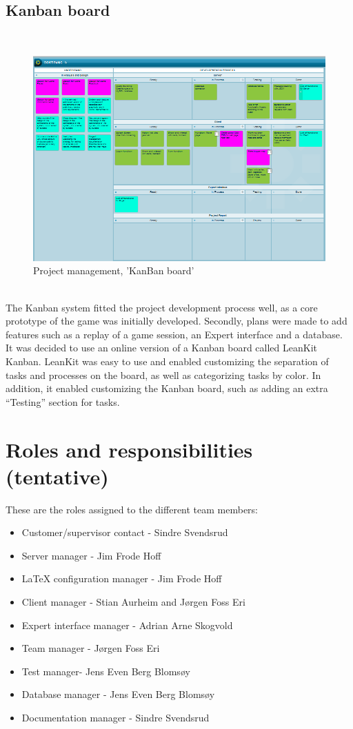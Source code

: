 \subsection{Kanban board}
\\
\begin{figure}[H]
  \centering
    \includegraphics[width=1.0\textwidth]{img/kanban.png}
  \caption{Project management, 'KanBan board'} 
  \label{fig:kanban}
\end{figure}
\\
The Kanban system fitted the project development process well, as a core 
prototype of the game was initially developed. Secondly, plans were made to 
add features such as a replay of a game session, an Expert interface and a 
database. It was decided to use an online version of a Kanban board called 
LeanKit Kanban. LeanKit was easy to use and enabled customizing the separation 
of tasks and processes on the board, as well as categorizing tasks by color. 
In addition, it enabled customizing the Kanban board, such as adding an extra 
“Testing” section for tasks.




\section{Roles and responsibilities (tentative)}
These are the roles assigned to the different team members:

\begin{itemize} \setlength{\itemsep}{0cm}\setlength{\parskip}{0cm}
	\item Customer/supervisor contact - Sindre Svendsrud
	\item Server manager - Jim Frode Hoff
	\item LaTeX configuration manager - Jim Frode Hoff
	\item Client manager - Stian Aurheim and Jørgen Foss Eri
	\item Expert interface manager - Adrian Arne Skogvold
	\item Team manager - Jørgen Foss Eri
	\item Test manager- Jens Even Berg Blomsøy
	\item Database manager - Jens Even Berg Blomsøy
	\item Documentation manager - Sindre Svendsrud
\end{itemize}

